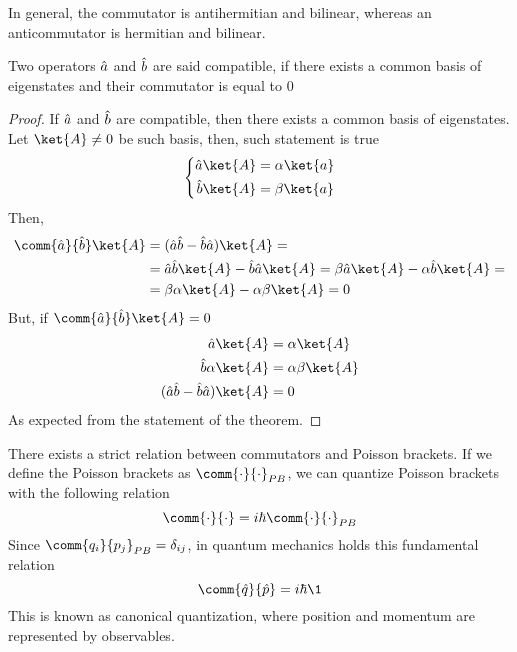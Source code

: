 \documentclass[../qm.tex]{subfiles}
\begin{document}
	In general, the commutator is antihermitian and bilinear, whereas an anticommutator is hermitian and bilinear.\\
	\begin{thm}[Compatibility]
		Two operators $\hat{a}$ and $\hat{b}$ are said compatible, if there exists a common basis of eigenstates and their commutator is equal to $0$
		\label{thm:comp}
	\end{thm}
	\begin{proof}
		If $\hat{a}$ and $\hat{b}$ are compatible, then there exists a common basis of eigenstates. Let $\ket{A}\ne0$ be such basis, then, such statement is true
		\begin{equation}
			\left\{\begin{aligned}
					\opr{a}\ket{A}&=\alpha\ket{a}\\
					\opr{b}\ket{A}&=\beta\ket{a}
			\end{aligned}\right.
			\label{eq:comp1}
		\end{equation}
		Then,
		\begin{equation}
			\begin{aligned}
				\comm{\opr{a}}{\opr{b}}\ket{A}&=(\opr{a}\opr{b}-\opr{b}\opr{a})\ket{A}=\\
				&=\opr{a}\opr{b}\ket{A}-\opr{b}\opr{a}\ket{A}=\beta\opr{a}\ket{A}-\alpha\opr{b}\ket{A}=\\
				&=\beta\alpha\ket{A}-\alpha\beta\ket{A}=0
			\end{aligned}
			\label{eq:comp1d}
		\end{equation}
		But, if $\comm{\opr{a}}{\opr{b}}\ket{A}=0$
		\begin{equation}
			\begin{aligned}
				\opr{a}\ket{A}&=\alpha\ket{A}\\
				\opr{b}\alpha\ket{A}&=\alpha\beta\ket{A}\\
				(\opr{a}\opr{b}-\opr{b}\opr{a})\ket{A}&=0
			\end{aligned}
			\label{eq:comp2}
		\end{equation}
		As expected from the statement of the theorem.
	\end{proof}
	\begin{pos}
		\label{pos:canquant}
		There exists a strict relation between commutators and Poisson brackets. If we define the Poisson brackets as $\comm{\cdot}{\cdot}_{PB}$, we can quantize Poisson brackets with the following relation
		\begin{equation*}
			\comm{\cdot}{\cdot}=i\hbar\comm{\cdot}{\cdot}_{PB}
		\end{equation*}
		Since $\comm{q_i}{p_j}_{PB}=\delta_{ij}$, in quantum mechanics holds this fundamental relation
		\begin{equation}
			\comm{\opr{q}}{\opr{p}}=i\hbar\1
			\label{eq:canonical quantization}
		\end{equation}
		This is known as canonical quantization, where position and momentum are represented by observables.
	\end{pos}
\end{document}
